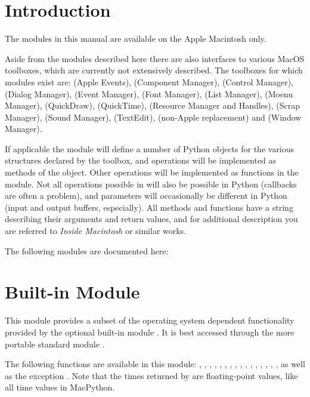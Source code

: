 \section{Introduction}
\label{intro}

The modules in this manual are available on the Apple Macintosh only.

Aside from the modules described here there are also interfaces to
various MacOS toolboxes, which are currently not extensively
described. The toolboxes for which modules exist are:
 (Apple Events),
 (Component Manager),
 (Control Manager),
 (Dialog Manager),
 (Event Manager),
 (Font Manager),
 (List Manager),
 (Moenu Manager),
 (QuickDraw),
 (QuickTime),
 (Resource Manager and Handles),
 (Scrap Manager),
 (Sound Manager),
 (TextEdit),
 (non-Apple  replacement) and
 (Window Manager).

If applicable the module will define a number of Python objects for
the various structures declared by the toolbox, and operations will be
implemented as methods of the object. Other operations will be
implemented as functions in the module. Not all operations possible in
\C{} will also be possible in Python (callbacks are often a problem), and
parameters will occasionally be different in Python (input and output
buffers, especially). All methods and functions have a 
string describing their arguments and return values, and for
additional description you are referred to \emph{Inside Macintosh} or
similar works.

The following modules are documented here:

\localmoduletable


\section{Built-in Module }



This module provides a subset of the operating system dependent
functionality provided by the optional built-in module .
It is best accessed through the more portable standard module
.

The following functions are available in this module:
,
,
,
,
,
,
,
,
,
,
,
,
,
,
,
,
as well as the exception . Note that the times
returned by  are floating-point values, like all time
values in MacPython.

